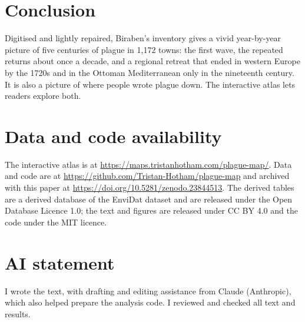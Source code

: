 \documentclass[11pt,a4paper]{article}
\begin{document}
\section{Conclusion}
Digitised and lightly repaired, Biraben's inventory gives a vivid year-by-year picture of five centuries of plague in 1,172 towns: the first wave, the repeated returns about once a decade, and a regional retreat that ended in western Europe by the 1720s and in the Ottoman Mediterranean only in the nineteenth century. It is also a picture of where people wrote plague down. The interactive atlas lets readers explore both.

\section*{Data and code availability}
The interactive atlas is at \url{https://maps.tristanhotham.com/plague-map/}. Data and code are at \url{https://github.com/Tristan-Hotham/plague-map} and archived with this paper at \url{https://doi.org/10.5281/zenodo.23844513}. The derived tables are a derived database of the EnviDat dataset and are released under the Open Database Licence 1.0; the text and figures are released under CC BY 4.0 and the code under the MIT licence.

\section*{AI statement}
I wrote the text, with drafting and editing assistance from Claude (Anthropic), which also helped prepare the analysis code. I reviewed and checked all text and results.
\end{document}
